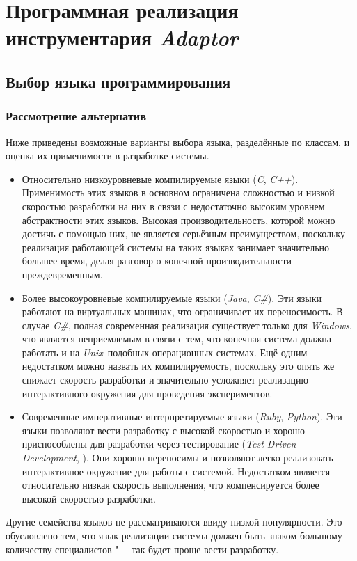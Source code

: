 \section{Программная реализация инструментария \textit{Adaptor}}
\subsection{Выбор языка программирования}
\subsubsection{Рассмотрение альтернатив}
Ниже приведены возможные варианты выбора языка, разделённые по классам, и оценка их применимости в разработке системы.
\begin{itemize}
    \item Относительно низкоуровневые компилируемые языки (\textit{C}, \textit{C++}). Применимость этих языков в основном ограничена сложностью и низкой скоростью разработки на них в связи с недостаточно высоким уровнем абстрактности этих языков. Высокая производительность, которой можно достичь с помощью них, не является серьёзным преимуществом, поскольку реализация работающей системы на таких языках занимает значительно большее время, делая разговор о конечной производительности преждевременным.
    \item Более высокоуровневые компилируемые языки (\textit{Java}, \textit{C\#}). Эти языки работают на виртуальных машинах, что ограничивает их переносимость. В случае \textit{C\#}, полная современная реализация существует только для \textit{Windows}, что является неприемлемым в связи с тем, что конечная система должна работать и на \textit{Unix}--подобных операционных системах. Ещё одним недостатком можно назвать их компилируемость, поскольку это опять же снижает скорость разработки и значительно усложняет реализацию интерактивного окружения для проведения экспериментов.
    \item Современные императивные интерпретируемые языки (\textit{Ruby}, \textit{Python}). Эти языки позволяют вести разработку с высокой скоростью и хорошо приспособлены для разработки через тестирование (\textit{Test-Driven Development}, \cite{tdd}). Они хорошо переносимы и позволяют легко реализовать интерактивное окружение для работы с системой. Недостатком является относительно низкая скорость выполнения, что компенсируется более высокой скоростью разработки.
\end{itemize}

Другие семейства языков не рассматриваются ввиду низкой популярности. Это обусловлено тем, что язык реализации системы должен быть знаком большому количеству специалистов "--- так будет проще вести  разработку.


